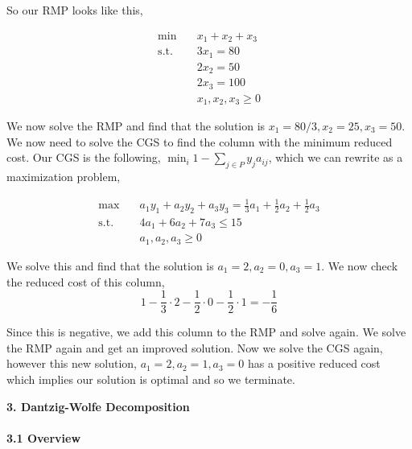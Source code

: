 \documentclass[11pt]{article}
\begin{document}
\noindent So our RMP looks like this,

$$
\begin{aligned}
    \min \quad & x_1 + x_2 + x_3 \\
    \text{s.t.} \quad & 3x_1 = 80 \\
    & 2x_2 = 50 \\
    & 2x_3 = 100 \\
    & x_1, x_2, x_3 \geq 0
\end{aligned}
$$

\noindent We now solve the RMP and find that the solution is $x_1 = 80/3, x_2 = 25, x_3 = 50$. We now need to solve the CGS to find the column with the minimum reduced cost. Our CGS is the following, $\min_i 1 - \sum_{j \in P} y_j a_{ij}$, which we can rewrite as a maximization problem, 

$$
\begin{aligned}
    \max \quad & a_1 y_1 + a_2 y_2 + a_3 y_3 = \frac{1}{3} a_1 + \frac{1}{2} a_2 + \frac{1}{2} a_3 \\
    \text{s.t.} \quad & 4a_1 + 6a_2 + 7a_3 \leq 15 \\
    & a_1, a_2, a_3 \geq 0
\end{aligned}
$$

\noindent We solve this and find that the solution is $a_1 = 2, a_2 =0, a_3 = 1$. We now check the reduced cost of this column,
$$ 1 - \frac{1}{3} \cdot 2 - \frac{1}{2} \cdot 0 - \frac{1}{2} \cdot 1 = - \frac{1}{6} $$

\noindent Since this is negative, we add this column to the RMP and solve again. We solve the RMP again and get an improved solution. Now we solve the CGS again, however this new solution, $a_1 = 2, a_2 = 1, a_3 = 0$ has a positive reduced cost which implies our solution is optimal and so we terminate.


\newpage

\noindent \textbf{\large{3. Dantzig-Wolfe Decomposition}} \\
\\

\noindent \textbf{3.1 Overview}
\\
\end{document}
